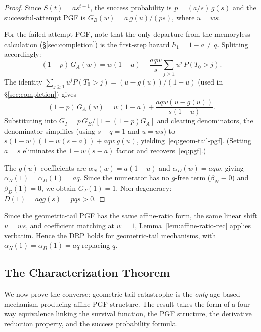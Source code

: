 \documentclass[11pt]{article}
\theoremstyle{plain}
\theoremstyle{definition}
\theoremstyle{remark}
\begin{document}
\begin{proof}
Since $S(t) = as^{t-1}$, the success probability is $p = (a/s)\,g(s)$ and the successful-attempt PGF is $G_B(w) = a\,g(u)/(ps)$, where $u = ws$.

For the failed-attempt PGF, note that the only departure from the memoryless calculation (\S\ref{sec:completion}) is the first-step hazard $h_1 = 1-a \neq q$.  Splitting accordingly:
\[
  (1-p)\,G_A(w) = w(1-a) + \frac{aqw}{s}\sum_{j \geq 1}u^j\,P(T_0 > j).
\]
The identity $\sum_{j \geq 1}u^j P(T_0 > j) = (u - g(u))/(1-u)$ (used in \S\ref{sec:completion}) gives
\[
  (1-p)\,G_A(w) = w(1-a) + \frac{aqw(u - g(u))}{s(1-u)}.
\]
Substituting into $G_T = p\,G_B/[1-(1-p)G_A]$ and clearing denominators, the denominator simplifies (using $s + q = 1$ and $u = ws$) to $s(1-w)(1-w(s-a)) + aqw\,g(u)$, yielding~\eqref{eq:geom-tail-pgf}.  (Setting $a = s$ eliminates the $1-w(s-a)$ factor and recovers~\eqref{eq:pgf}.)

The $g(u)$-coefficients are $\alpha_N(w) = a(1-u)$ and $\alpha_D(w) = aqw$, giving $\alpha_N(1) = \alpha_D(1) = aq$.  Since the numerator has no $g$-free term ($\beta_N \equiv 0$) and $\beta_D(1) = 0$, we obtain $G_T(1) = 1$.  Non-degeneracy: $D(1) = aqg(s) = pqs > 0$.
\end{proof}


Since the geometric-tail PGF has the same affine-ratio form, the same linear shift $u=ws$, and coefficient matching at $w=1$, Lemma~\ref{lem:affine-ratio-rec} applies verbatim. Hence the DRP holds for geometric-tail mechanisms, with $\alpha_N(1)=\alpha_D(1)=aq$ replacing $q$.



\subsection{The Characterization Theorem}\label{sec:char-thm}

We now prove the converse: geometric-tail catastrophe is the \emph{only} age-based mechanism producing affine PGF structure.  The result takes the form of a four-way equivalence linking the survival function, the PGF structure, the derivative reduction property, and the success probability formula.
\end{document}
